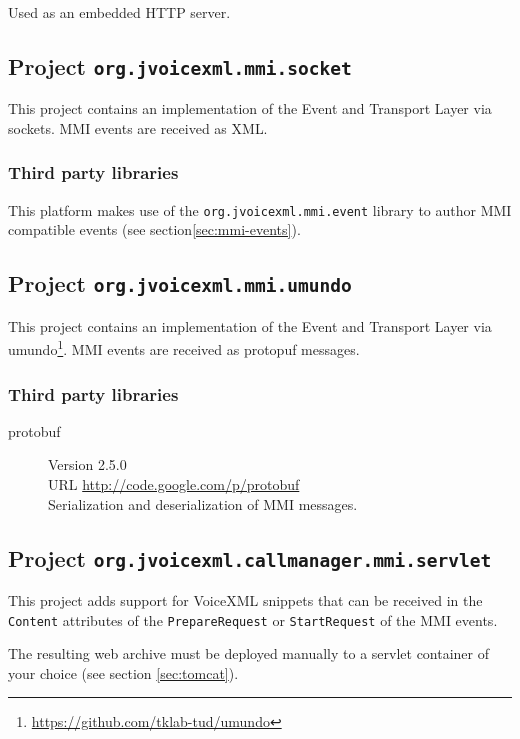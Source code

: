 \documentclass[11pt,a4paper]{article}
\begin{document}
Used as an embedded HTTP server.

\subsection{Project \texttt{org.jvoicexml.mmi.socket}}

This project contains an implementation of the Event and Transport Layer
via sockets. MMI events are received as XML.

\subsubsection{Third party libraries}

This platform makes use of the \lstinline{org.jvoicexml.mmi.event} library
to author MMI compatible events (see section\ref{sec:mmi-events}).

\subsection{Project \texttt{org.jvoicexml.mmi.umundo}}

This project contains an implementation of the Event and Transport Layer
via umundo\footnote{\url{https://github.com/tklab-tud/umundo}}.
MMI events are received as protopuf messages.

\subsubsection{Third party libraries}

\begin{description}
\item[protobuf] Version 2.5.0 \\
URL \url{http://code.google.com/p/protobuf} \\
Serialization and deserialization of MMI messages.
\end{description}

\subsection{Project \texttt{org.jvoicexml.callmanager.mmi.servlet}}
\label{sec:mmi-servlet}

This project adds support for VoiceXML snippets that can be received
in the \lstinline{Content} attributes of the \lstinline{PrepareRequest}
or \lstinline{StartRequest} of the MMI events.

The resulting web archive must be deployed manually to a servlet container
of your choice (see section \ref{sec:tomcat}).
\end{document}
